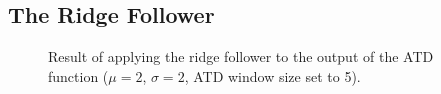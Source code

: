 \documentclass[11pt,a4paper]{article}
\begin{document}
\begin{multicols}{2}
	\subsection{The Ridge Follower}
			\begin{figure}
				\centering
				 \;
				\caption{Result of applying the ridge follower to the output of the ATD function ($\mu = 2$, $\sigma = 2$, ATD window size set to 5).}
				\label{fig:RF_img}
			\end{figure}


\end{multicols}
\end{document}
